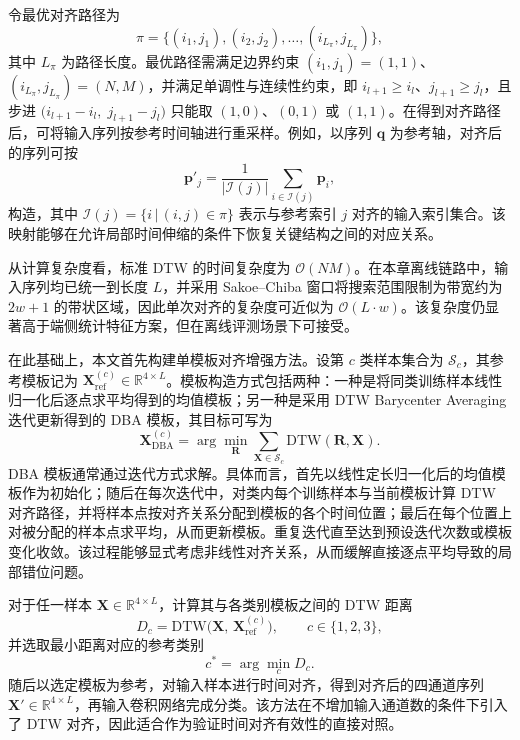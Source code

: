 \documentclass{xdupgthesis}
\begin{document}
令最优对齐路径为
\begin{equation}
    \pi=\{(i_1,j_1),(i_2,j_2),\ldots,(i_{L_\pi},j_{L_\pi})\},
\end{equation}
其中 $L_\pi$ 为路径长度。最优路径需满足边界约束 $(i_1,j_1)=(1,1)$、$(i_{L_\pi},j_{L_\pi})=(N,M)$，并满足单调性与连续性约束，即 $i_{l+1}\ge i_l$、$j_{l+1}\ge j_l$，且步进 $\big(i_{l+1}-i_l,\;j_{l+1}-j_l\big)$ 只能取 $(1,0)$、$(0,1)$ 或 $(1,1)$。在得到对齐路径后，可将输入序列按参考时间轴进行重采样。例如，以序列 $\mathbf{q}$ 为参考轴，对齐后的序列可按
\begin{equation}
    \mathbf{p}'_{j}=\frac{1}{|\mathcal{I}(j)|}\sum_{i\in\mathcal{I}(j)}\mathbf{p}_{i},
\end{equation}
构造，其中 $\mathcal{I}(j)=\{i\,|\,(i,j)\in\pi\}$ 表示与参考索引 $j$ 对齐的输入索引集合。该映射能够在允许局部时间伸缩的条件下恢复关键结构之间的对应关系。

从计算复杂度看，标准 DTW 的时间复杂度为 $\mathcal{O}(NM)$。在本章离线链路中，输入序列均已统一到长度 $L$，并采用 Sakoe--Chiba 窗口将搜索范围限制为带宽约为 $2w+1$ 的带状区域，因此单次对齐的复杂度可近似为 $\mathcal{O}(L\cdot w)$。该复杂度仍显著高于端侧统计特征方案，但在离线评测场景下可接受。

在此基础上，本文首先构建单模板对齐增强方法。设第 $c$ 类样本集合为 $\mathcal{S}_c$，其参考模板记为 $\mathbf{X}_{\mathrm{ref}}^{(c)}\in\mathbb{R}^{4\times L}$。模板构造方式包括两种：一种是将同类训练样本线性归一化后逐点求平均得到的均值模板；另一种是采用 DTW Barycenter Averaging 迭代更新得到的 DBA 模板，其目标可写为
\begin{equation}
    \mathbf{X}_{\mathrm{DBA}}^{(c)}=\arg\min_{\mathbf{R}}\sum_{\mathbf{X}\in\mathcal{S}_c}\mathrm{DTW}(\mathbf{R},\mathbf{X}).
\end{equation}
DBA 模板通常通过迭代方式求解。具体而言，首先以线性定长归一化后的均值模板作为初始化；随后在每次迭代中，对类内每个训练样本与当前模板计算 DTW 对齐路径，并将样本点按对齐关系分配到模板的各个时间位置；最后在每个位置上对被分配的样本点求平均，从而更新模板。重复迭代直至达到预设迭代次数或模板变化收敛。该过程能够显式考虑非线性对齐关系，从而缓解直接逐点平均导致的局部错位问题。

对于任一样本 $\mathbf{X}\in\mathbb{R}^{4\times L}$，计算其与各类别模板之间的 DTW 距离
\begin{equation}
    D_c=\mathrm{DTW}\big(\mathbf{X},\,\mathbf{X}_{\mathrm{ref}}^{(c)}\big),\qquad c\in\{1,2,3\},
\end{equation}
并选取最小距离对应的参考类别
\begin{equation}
    c^\ast=\arg\min_c D_c.
\end{equation}
随后以选定模板为参考，对输入样本进行时间对齐，得到对齐后的四通道序列 $\mathbf{X}'\in\mathbb{R}^{4\times L}$，再输入卷积网络完成分类。该方法在不增加输入通道数的条件下引入了 DTW 对齐，因此适合作为验证时间对齐有效性的直接对照。
\end{document}
